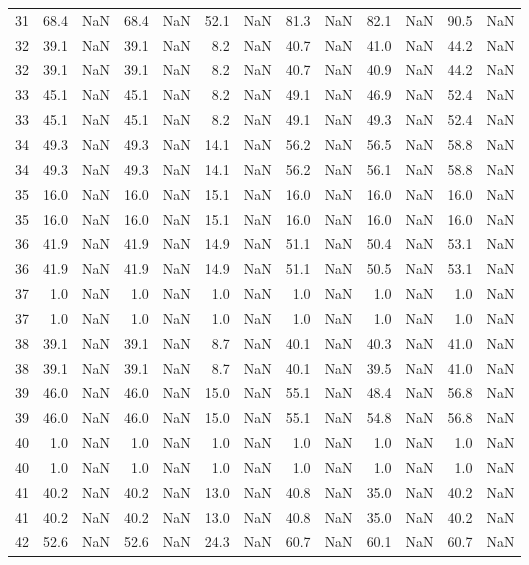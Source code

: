 \begin{tabular}{lrrrrrrrrrrrr}
31 & 68.4 & NaN & 68.4 & NaN & 52.1 & NaN & 81.3 & NaN & 82.1 & NaN & 90.5 & NaN \\
32 & 39.1 & NaN & 39.1 & NaN & 8.2 & NaN & 40.7 & NaN & 41.0 & NaN & 44.2 & NaN \\
32 & 39.1 & NaN & 39.1 & NaN & 8.2 & NaN & 40.7 & NaN & 40.9 & NaN & 44.2 & NaN \\
33 & 45.1 & NaN & 45.1 & NaN & 8.2 & NaN & 49.1 & NaN & 46.9 & NaN & 52.4 & NaN \\
33 & 45.1 & NaN & 45.1 & NaN & 8.2 & NaN & 49.1 & NaN & 49.3 & NaN & 52.4 & NaN \\
34 & 49.3 & NaN & 49.3 & NaN & 14.1 & NaN & 56.2 & NaN & 56.5 & NaN & 58.8 & NaN \\
34 & 49.3 & NaN & 49.3 & NaN & 14.1 & NaN & 56.2 & NaN & 56.1 & NaN & 58.8 & NaN \\
35 & 16.0 & NaN & 16.0 & NaN & 15.1 & NaN & 16.0 & NaN & 16.0 & NaN & 16.0 & NaN \\
35 & 16.0 & NaN & 16.0 & NaN & 15.1 & NaN & 16.0 & NaN & 16.0 & NaN & 16.0 & NaN \\
36 & 41.9 & NaN & 41.9 & NaN & 14.9 & NaN & 51.1 & NaN & 50.4 & NaN & 53.1 & NaN \\
36 & 41.9 & NaN & 41.9 & NaN & 14.9 & NaN & 51.1 & NaN & 50.5 & NaN & 53.1 & NaN \\
37 & 1.0 & NaN & 1.0 & NaN & 1.0 & NaN & 1.0 & NaN & 1.0 & NaN & 1.0 & NaN \\
37 & 1.0 & NaN & 1.0 & NaN & 1.0 & NaN & 1.0 & NaN & 1.0 & NaN & 1.0 & NaN \\
38 & 39.1 & NaN & 39.1 & NaN & 8.7 & NaN & 40.1 & NaN & 40.3 & NaN & 41.0 & NaN \\
38 & 39.1 & NaN & 39.1 & NaN & 8.7 & NaN & 40.1 & NaN & 39.5 & NaN & 41.0 & NaN \\
39 & 46.0 & NaN & 46.0 & NaN & 15.0 & NaN & 55.1 & NaN & 48.4 & NaN & 56.8 & NaN \\
39 & 46.0 & NaN & 46.0 & NaN & 15.0 & NaN & 55.1 & NaN & 54.8 & NaN & 56.8 & NaN \\
40 & 1.0 & NaN & 1.0 & NaN & 1.0 & NaN & 1.0 & NaN & 1.0 & NaN & 1.0 & NaN \\
40 & 1.0 & NaN & 1.0 & NaN & 1.0 & NaN & 1.0 & NaN & 1.0 & NaN & 1.0 & NaN \\
41 & 40.2 & NaN & 40.2 & NaN & 13.0 & NaN & 40.8 & NaN & 35.0 & NaN & 40.2 & NaN \\
41 & 40.2 & NaN & 40.2 & NaN & 13.0 & NaN & 40.8 & NaN & 35.0 & NaN & 40.2 & NaN \\
42 & 52.6 & NaN & 52.6 & NaN & 24.3 & NaN & 60.7 & NaN & 60.1 & NaN & 60.7 & NaN \\

\end{tabular}
